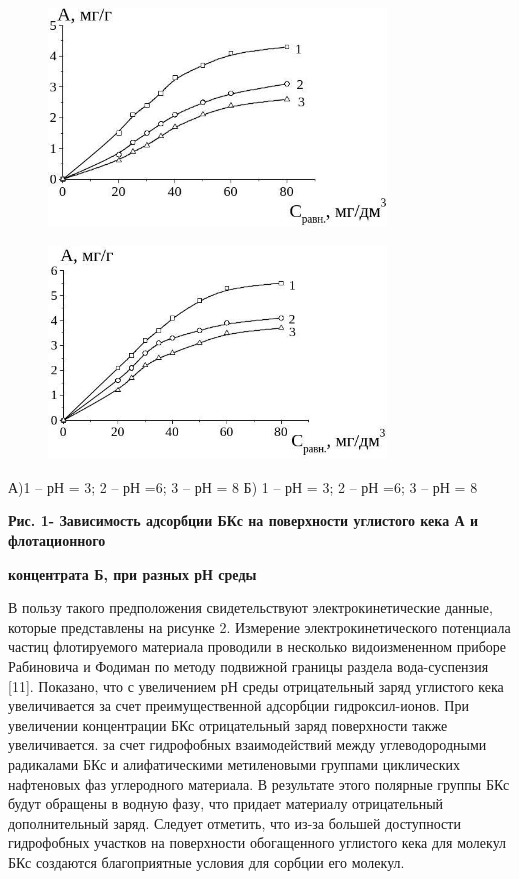 \begin{figure}[H]
	\centering
	\includegraphics[width=0.8\textwidth]{assets/1033}
	\caption*{}
\end{figure}\begin{figure}[H]
	\centering
	\includegraphics[width=0.8\textwidth]{assets/1034}
	\caption*{}
\end{figure}

А)1 -- рН = 3; 2 -- рН =6; 3 -- рН = 8 Б) 1 -- рН = 3; 2 -- рН =6; 3 --
рН = 8

\textbf{Рис. 1- Зависимость адсорбции БКс на поверхности углистого кека
А и флотационного}

\textbf{концентрата Б, при разных рН среды}

В пользу такого предположения свидетельствуют электрокинетические
данные, которые представлены на рисунке 2. Измерение
электрокинетического потенциала частиц флотируемого материала проводили
в несколько видоизмененном приборе Рабиновича и Фодиман по методу
подвижной границы раздела вода-суспензия {[}11{]}. Показано, что с
увеличением рН среды отрицательный заряд углистого кека увеличивается за
счет преимущественной адсорбции гидроксил-ионов. При увеличении
концентрации БКс отрицательный заряд поверхности также увеличивается. за
счет гидрофобных взаимодействий между углеводородными радикалами БКс и
алифатическими метиленовыми группами циклических нафтеновых фаз
углеродного материала. В результате этого полярные группы БКс будут
обращены в водную фазу, что придает материалу отрицательный
дополнительный заряд. Следует отметить, что из-за большей доступности
гидрофобных участков на поверхности обогащенного углистого кека для
молекул БКс создаются благоприятные условия для сорбции его молекул.

